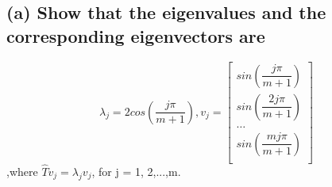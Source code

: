 \documentclass[12pt]{article}
\begin{document}
        \subsection*{(a) Show that the eigenvalues and the corresponding eigenvectors are}
                \[
                    \lambda_j=2cos(\dfrac{j \pi}{m+1}), 
                    v_j = \left[\begin{array}{c}
                            sin(\dfrac{j \pi}{m+1})\\
                            sin(\dfrac{2j \pi}{m+1})\\
                            \hdots\\
                            sin(\dfrac{mj \pi}{m+1})\\
                            \end{array}\right]
                \]
                ,where $\hat Tv_j = \lambda_jv_j$, for j = 1, 2,...,m.
\end{document}
